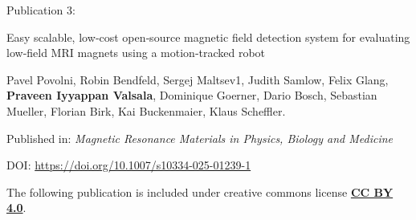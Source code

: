 \label{chap:paper2}



\vspace*{\fill}

\raggedright
\huge Publication 3: 

\huge Easy scalable, low‐cost open‐source magnetic field detection system for evaluating low‐field MRI magnets using a motion‐tracked robot

\normalsize Pavel Povolni, Robin Bendfeld, Sergej Maltsev1, Judith Samlow, Felix Glang, \textbf{Praveen Iyyappan Valsala}, Dominique Goerner, Dario Bosch, Sebastian Mueller, Florian Birk, Kai Buckenmaier, Klaus Scheffler.


Published in: \textit{Magnetic Resonance Materials in Physics, Biology and Medicine}

DOI: \href{https://doi.org/10.1007/s10334-025-01239-1}{https://doi.org/10.1007/s10334-025-01239-1}



\vspace*{1cm}

The following publication is included under creative commons license \href{https://creativecommons.org/licenses/by/4.0/}{\textbf{CC BY 4.0}}.
\vspace*{\fill}
\pagebreak

